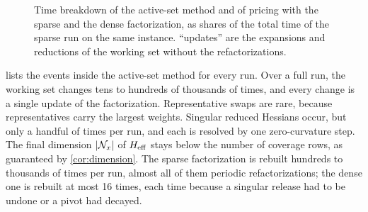 \begin{figure}[ht]
\centering
{}
\caption{Time breakdown of the active-set method and of pricing with the sparse and the dense
factorization, as shares of the total time of the sparse run on the same instance. ``updates''
are the expansions and reductions of the working set without the refactorizations.}
\label{fig:breakdown}
\end{figure}

 lists the events inside the active-set method for every run. Over a full
run, the working set changes tens to hundreds of thousands of times, and every change is a
single update of the factorization. Representative swaps are rare, because representatives
carry the largest weights. Singular reduced Hessians occur, but only a handful of times per
run, and each is resolved by one zero-curvature step. The final dimension $|\mathcal{N}_x|$ of $H_{\mathrm{eff}}$
stays below the number of coverage rows, as guaranteed by \cref{cor:dimension}. The sparse
factorization is rebuilt hundreds to thousands of times per run, almost all of them periodic
refactorizations; the dense one is rebuilt at most 16 times, each time because a singular
release had to be undone or a pivot had decayed.

